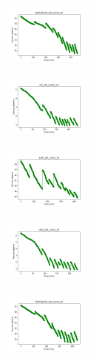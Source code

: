 \begin{figure}[H]
\begin{subfigure}
    \end{subfigure}
    \hfill
    \begin{subfigure}
        \centering
        \includegraphics[width=0.234\textwidth]{img/ils/newthyroid_set_const_10_277451237_cost.png}
    \end{subfigure}
    \hfill
    \begin{subfigure}
        \centering
        \includegraphics[width=0.234\textwidth]{img/ils/iris_set_const_10_49258669_cost.png}
    \end{subfigure}
    \hfill
    \begin{subfigure}
        \centering
        \includegraphics[width=0.234\textwidth]{img/ils/ecoli_set_const_10_49258669_cost.png}
    \end{subfigure}
    \hfill
    \begin{subfigure}
        \centering
        \includegraphics[width=0.234\textwidth]{img/ils/rand_set_const_10_49258669_cost.png}
    \end{subfigure}
    \hfill
    \begin{subfigure}
        \centering
        \includegraphics[width=0.234\textwidth]{img/ils/newthyroid_set_const_10_49258669_cost.png}
    \end{subfigure}
    \hfill
    \begin{subfigure}

\end{subfigure}
\end{figure}
